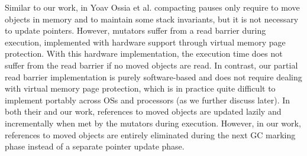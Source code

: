 \documentclass[sigplan,10pt,review,anonymous]{acmart}\settopmatter{printfolios=true,printccs=false,printacmref=false}
\newcommand{\egb}[1]{\color{blue}\fbox{\bfseries\sffamily\scriptsize Elisa:}{\sf\small$\blacktriangleright$\textit{#1}$\blacktriangleleft$}\color{black}}
\begin{document}
Similar to our work, in Yoav Ossia et al. \cite{VirtualMemConcCompact} compacting pauses only require to move objects in memory and to maintain some stack invariants, but it is not necessary to update pointers. 
However, mutators suffer from a read barrier during execution, implemented with hardware support through virtual memory page protection. With this hardware implementation, the execution time does not suffer from the read barrier if no moved objects are read. 
In contrast, our partial read barrier implementation is purely software-based and does not require dealing with virtual memory page protection, which is in practice quite difficult to implement portably across OSs and processors (as we further discuss later). %
In both their and our work, references to moved objects are updated lazily and incrementally when met by the mutators during execution.
However, in our work, references to moved objects are entirely eliminated during the next GC marking phase instead of a separate pointer update phase.
\end{document}
